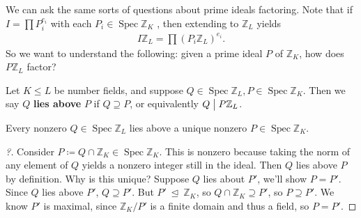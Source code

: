 \begin{remark}
We can ask the same sorts of questions about prime ideals factoring.
Note that if \(I = \prod P_i^{e_i}\) with each
\(P_i \in \operatorname{Spec}{\mathbb{Z}}_K\) , then extending to
\({\mathbb{Z}}_L\) yields
\begin{align*}
I{\mathbb{Z}}_L = \prod (P_i {\mathbb{Z}}_L)^{e_i}
.\end{align*}
So we want to understand the following: given a prime ideal \(P\) of
\({\mathbb{Z}}_K\), how does \(P{\mathbb{Z}}_L\) factor?

\end{remark}

\begin{definition}

Let \(K\leq L\) be number fields, and suppose
\(Q\in \operatorname{Spec}{\mathbb{Z}}_L, P\in \operatorname{Spec}{\mathbb{Z}}_K\).
Then we say \(Q\) \textbf{lies above} \(P\) if \(Q \supseteq P\), or
equivalently \(Q \bigm|P{\mathbb{Z}}_L\).

\end{definition}

\begin{proposition}[?]

Every nonzero \(Q\in \operatorname{Spec}{\mathbb{Z}}_L\) lies above a
unique nonzero \(P \in \operatorname{Spec}{\mathbb{Z}}_K\).

\end{proposition}

\begin{proof}[?]

Consider
\(P \coloneqq Q \cap{\mathbb{Z}}_K \in \operatorname{Spec}{\mathbb{Z}}_K\).
This is nonzero because taking the norm of any element of \(Q\) yields a
nonzero integer still in the ideal. Then \(Q\) lies above \(P\) by
definition. Why is this unique? Suppose \(Q\) lies about \(P'\), we'll
show \(P = P'\). Since \(Q\) lies above \(P'\), \(Q\supseteq P'\). But
\(P'{~\trianglelefteq~}{\mathbb{Z}}_K\), so
\(Q\cap{\mathbb{Z}}_K \supseteq P'\), so \(P \supseteq P'\). We know
\(P'\) is maximal, since \({\mathbb{Z}}_K/P'\) is a finite domain and
thus a field, so \(P = P'\).

\end{proof}

